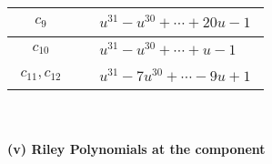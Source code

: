 \documentclass[1p]{elsarticle_modified}
\theoremstyle{definition}
\begin{document}
\begin{tabular}{m{50pt}|m{274pt}}
\hline $$\begin{aligned}c_{9}\end{aligned}$$&$\begin{aligned}
&u^{31}- u^{30}+\cdots+20 u-1
\end{aligned}$\\
\hline $$\begin{aligned}c_{10}\end{aligned}$$&$\begin{aligned}
&u^{31}- u^{30}+\cdots+u-1
\end{aligned}$\\
\hline $$\begin{aligned}c_{11},c_{12}\end{aligned}$$&$\begin{aligned}
&u^{31}-7 u^{30}+\cdots-9 u+1
\end{aligned}$\\
\hline
\end{tabular}\\~\\
\newpage\renewcommand{\arraystretch}{1}
\flushleft \textbf{(v) Riley Polynomials at the component}\newline \\
\end{document}
